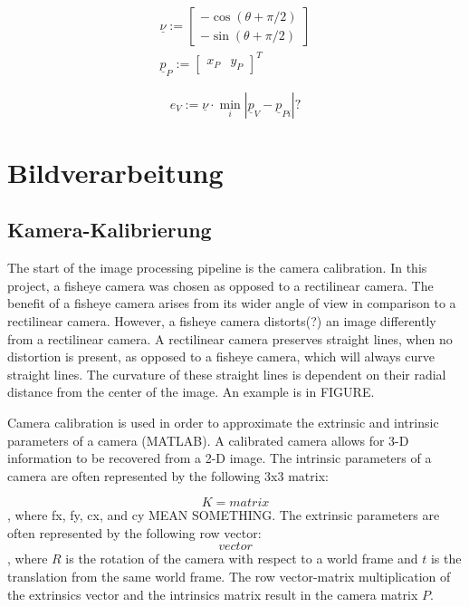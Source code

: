 \documentclass[arbeit=studie,oneside,BCOR=12mm]{ArbeitRST}
\begin{document}
\begin{gather}
  \underline{\nu} := 
  \begin{bmatrix}
    -\cos(\theta + \pi/2) \\
    -\sin(\theta + \pi/2)
  \end{bmatrix} \\
  \underline{p}_P := 
  \begin{bmatrix}
    x_P & y_P
  \end{bmatrix}^T
\end{gather}

\begin{equation}
  e_V :=  \underline{\nu} \cdot \min_i |\underline{p}_V -  \underline{p}_{Pi}| ?
  \label{eq:Querabweichung}
\end{equation}

\chapter{Bildverarbeitung}
\section{Kamera-Kalibrierung}
The start of the image processing pipeline is the camera calibration. In this
project, a fisheye camera was chosen as opposed to a rectilinear camera. The
benefit of a fisheye camera arises from its wider angle of view in comparison
to a rectilinear camera. However, a fisheye camera distorts(?) an image
differently from a rectilinear camera. A rectilinear camera preserves straight
lines, when no distortion is present, as opposed to a fisheye camera, which
will always curve straight lines. The curvature of these straight lines is
dependent on their radial distance from the center of the image.  An example is
in FIGURE.

Camera calibration is used in order to approximate the extrinsic and intrinsic 
parameters of a camera (MATLAB). A calibrated camera allows for 3-D information
to be recovered from a 2-D image. The intrinsic parameters of a camera are often 
represented by the following 3x3 matrix:

$$K = matrix$$, where fx, fy, cx, and cy MEAN SOMETHING. The extrinsic
parameters are often represented by the following row vector:
$$vector$$, where $R$ is the rotation of the camera with respect to a world 
frame and $t$ is the translation from the same world frame. The row 
vector-matrix multiplication of the extrinsics vector and the intrinsics matrix
result in the camera matrix $P$.
\end{document}
